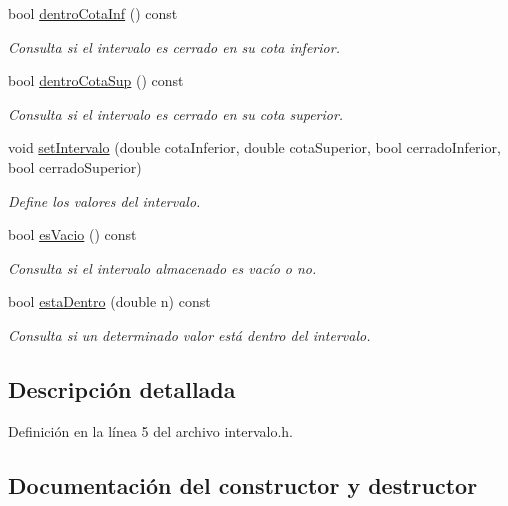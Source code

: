\begin{DoxyCompactItemize}
bool \hyperlink{classIntervalo_af972bcc502e3a7a6580a3fab83e43134}{dentro\+Cota\+Inf} () const 
\begin{DoxyCompactList}\small\item\em Consulta si el intervalo es cerrado en su cota inferior. \end{DoxyCompactList}\item 
bool \hyperlink{classIntervalo_af304bde2c8fc65e3a03324cd80f15f77}{dentro\+Cota\+Sup} () const 
\begin{DoxyCompactList}\small\item\em Consulta si el intervalo es cerrado en su cota superior. \end{DoxyCompactList}\item 
void \hyperlink{classIntervalo_a3e7cfa7c148a4e60be7040fecf506313}{set\+Intervalo} (double cota\+Inferior, double cota\+Superior, bool cerrado\+Inferior, bool cerrado\+Superior)
\begin{DoxyCompactList}\small\item\em Define los valores del intervalo. \end{DoxyCompactList}\item 
bool \hyperlink{classIntervalo_ab53adad27de8ec98cf8f4280bd3a7df9}{es\+Vacio} () const 
\begin{DoxyCompactList}\small\item\em Consulta si el intervalo almacenado es vacío o no. \end{DoxyCompactList}\item 
bool \hyperlink{classIntervalo_af55ac0bb47855ef909402e2ec76cda5b}{esta\+Dentro} (double n) const 
\begin{DoxyCompactList}\small\item\em Consulta si un determinado valor está dentro del intervalo. \end{DoxyCompactList}\end{DoxyCompactItemize}


\subsection{Descripción detallada}


Definición en la línea 5 del archivo intervalo.\+h.



\subsection{Documentación del constructor y destructor}
